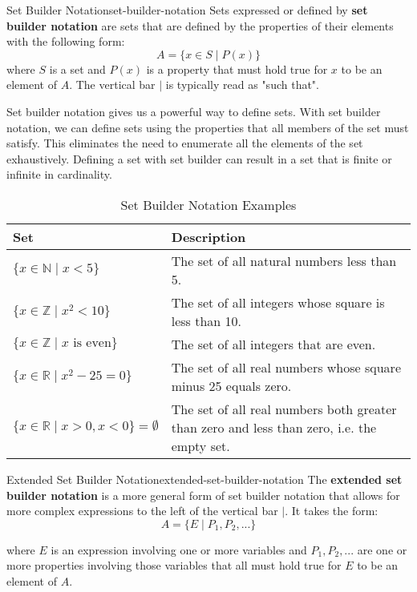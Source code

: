 \begin{definition}{Set Builder Notation}{set-builder-notation}
  Sets expressed or defined by \textbf{set builder notation} are sets that are defined by
  the properties of their elements with the following form:
  \[
    A = \{ x \in S \mid P(x) \}
  \]
  where \( S \) is a set and \( P(x) \) is a property that must hold true for \( x \) to be
  an element of \( A \). The vertical bar \( | \) is typically read as "such that".
\end{definition}

Set builder notation gives us a powerful way to define sets. With set builder notation, we can
define sets using the properties that all members of the set must satisfy. This eliminates the
need to enumerate all the elements of the set exhaustively. Defining a set with set builder
can result in a set that is finite or infinite in cardinality.

\begin{table}[H]
  \centering
  \begin{tabular}{p{2in} p{3in}}
    \toprule
    \textbf{Set} & \textbf{Description} \\
    \midrule
    \( \{ x \in \mathbb{N} \mid x < 5 \} \) & The set of all natural numbers less than 5. \\
    \( \{ x \in \mathbb{Z} \mid x^2 < 10 \} \) & The set of all integers whose square is less than 10. \\
    \( \{ x \in \mathbb{Z} \mid x \text{ is even} \} \) & The set of all integers that are even. \\
    \( \{ x \in \mathbb{R} \mid x^2 - 25 = 0\} \) & The set of all real numbers whose square minus 25 equals zero.\\
    \( \{ x \in \mathbb{R} \mid x > 0, x < 0\} = \emptyset \) &
      The set of all real numbers both greater than zero and less than zero, i.e. the empty set.  \\
    \end{tabular}
  \caption{Set Builder Notation Examples}
\end{table}

\begin{definition}{Extended Set Builder Notation}{extended-set-builder-notation}
  The \textbf{extended set builder notation} is a more general form of set builder notation
  that allows for more complex expressions to the left of the vertical bar \( | \).
  It takes the form:
  \[
    A = \{ E \mid P_1, P_2, ... \}
  \]

  where \( E \) is an expression involving one or more variables and \( P_1, P_2, ... \) are
  one or more properties involving those variables that all must hold true for \( E \) to be an
  element of \( A \).
\end{definition}

